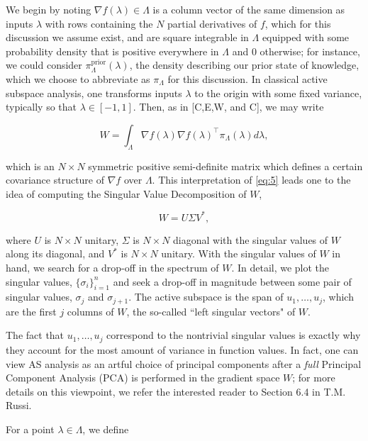 \documentclass{amsart}
\begin{document}
We begin by noting $\nabla f(\lambda)\in \Lambda$ is a column vector of the same dimension as inputs $\lambda$ with rows containing the $N$ partial derivatives of $f$, which for this discussion we assume exist, and are square integrable in $\Lambda$ equipped with some probability density that is positive everywhere in $\Lambda$ and 0 otherwise; for instance, we could consider $\pi_\Lambda^\text{prior}(\lambda)$, the density describing our prior state of knowledge, which we choose to abbreviate as $\pi_\Lambda$ for this discussion. In classical active subspace analysis, one transforms inputs $\lambda$ to the origin with some fixed variance, typically so that $\lambda\in [-1,1]$. Then, as in [C,E,W, and C], we may write

\begin{equation} \label{eq:6}
W=\int_\Lambda \nabla f(\lambda) \nabla f(\lambda)^\top  \pi_\Lambda(\lambda) d\lambda,
\end{equation} 

\noindent which is an $N\times N$ symmetric positive semi-definite matrix which defines a certain covariance structure of $\nabla f$ over $\Lambda$. This interpretation of \eqref{eq:5} leads one to the idea of computing the Singular Value Decomposition of $W$,

\begin{equation} \label{eq:7}
W=U\Sigma V^*,
\end{equation} 

\noindent where $U$ is $N \times N$ unitary, $\Sigma$ is $N \times N$ diagonal with the singular values of $W$ along its diagonal, and $V^*$ is $N \times N$ unitary. With the singular values of $W$ in hand, we search for a drop-off in the spectrum of $W$. In detail, we plot the singular values, $\{\sigma_i\}_{i=1}^n$ and seek a drop-off in magnitude between some pair of singular values, $\sigma_{j}$ and $\sigma_{j+1}$. The active subspace is the span of $u_1,\ldots,u_{j}$, which are the first $j$ columns of $W$, the so-called ``left singular vectors" of $W$. 

The fact that $u_1,\ldots,u_{j}$ correspond to the nontrivial singular values is exactly why they account for the most amount of variance in function values. In fact, one can view AS analysis as an artful choice of principal components after a \textit{full} Principal Component Analysis (PCA) is performed in the gradient space $W$; for more details on this viewpoint, we refer the interested reader to Section 6.4 in T.M. Russi.

For a point $\lambda \in \Lambda$, we define
\end{document}
